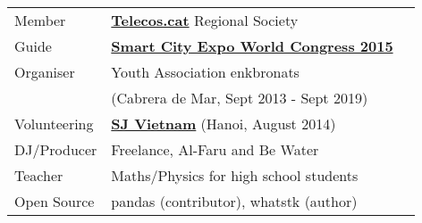 \documentclass[]{deedy-resume}
\begin{document}
\begin{minipage}[t]{0.45\textwidth}
{\fontsize{10pt}{12pt}
\begin{tabular}{lll}
Member & \textbf{\href{www.telecos.cat}{Telecos.cat}} Regional Society\\
Guide & \textbf{\href{http://www.smartcityexpo.com/en/}{Smart City Expo World Congress 2015}}\\
Organiser & Youth Association enkbronats \\
& (Cabrera de Mar, Sept 2013 - Sept 2019) \\
Volunteering &  \textbf{\href{http://www.sjvietnam.org/}{SJ Vietnam}} (Hanoi, August 2014)\\
DJ/Producer & Freelance, Al-Faru and Be Water\\
Teacher & Maths/Physics for high school students\\
Open Source & pandas (contributor), whatstk (author)
\end{tabular}\\
}

\sectionsep
{}


\end{minipage}

\newpage
{}
\end{document}
